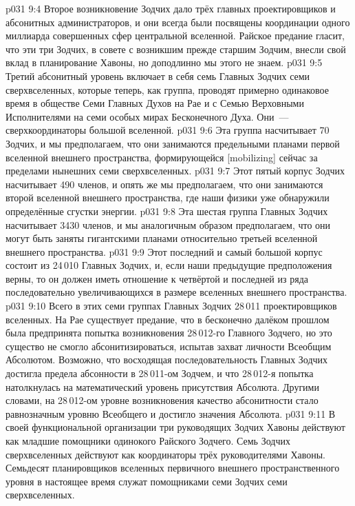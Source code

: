 \vs p031 9:4  Второе возникновение Зодчих дало трёх главных проектировщиков и абсонитных администраторов, и они всегда были посвящены координации одного миллиарда совершенных сфер центральной вселенной. Райское предание гласит, что эти три Зодчих, в совете с возникшим прежде старшим Зодчим, внесли свой вклад в планирование Хавоны, но доподлинно мы этого не знаем.
\vs p031 9:5  Третий абсонитный уровень включает в себя семь Главных Зодчих семи сверхвселенных, которые теперь, как группа, проводят примерно одинаковое время в обществе Семи Главных Духов на Рае и с Семью Верховными Исполнителями на семи особых мирах Бесконечного Духа. Они~--- сверхкоординаторы большой вселенной.
\vs p031 9:6  Эта группа насчитывает 70 Зодчих, и мы предполагаем, что они занимаются предельными планами первой вселенной внешнего пространства, формирующейся [mobilizing] сейчас за пределами нынешних семи сверхвселенных.
\vs p031 9:7  Этот пятый корпус Зодчих насчитывает 490 членов, и опять же мы предполагаем, что они занимаются второй вселенной внешнего пространства, где наши физики уже обнаружили определённые сгустки энергии.
\vs p031 9:8  Эта шестая группа Главных Зодчих насчитывает 3430 членов, и мы аналогичным образом предполагаем, что они могут быть заняты гигантскими планами относительно третьей вселенной внешнего пространства.
\vs p031 9:9  Этот последний и самый большой корпус состоит из 24\,010 Главных Зодчих, и, если наши предыдущие предположения верны, то он должен иметь отношение к четвёртой и последней из ряда последовательно увеличивающихся в размере вселенных внешнего пространства.
\vs p031 9:10 \pc Всего в этих семи группах Главных Зодчих 28\,011 проектировщиков вселенных. На Рае существует предание, что в бесконечно далёком прошлом была предпринята попытка возникновения 28\,012\hyp{}го Главного Зодчего, но это существо не смогло абсонитизироваться, испытав захват личности Всеобщим Абсолютом. Возможно, что восходящая последовательность Главных Зодчих достигла предела абсонности в 28\,011\hyp{}ом Зодчем, и что 28\,012\hyp{}я попытка натолкнулась на математический уровень присутствия Абсолюта. Другими словами, на 28\,012\hyp{}ом уровне возникновения качество абсонитности стало равнозначным уровню Всеобщего и достигло значения Абсолюта.
\vs p031 9:11 \pc В своей функциональной организации три руководящих Зодчих Хавоны действуют как младшие помощники одинокого Райского Зодчего. Семь Зодчих сверхвселенных действуют как координаторы трёх руководителями Хавоны. Семьдесят планировщиков вселенных первичного внешнего пространственного уровня в настоящее время служат помощниками семи Зодчих семи сверхвселенных.
